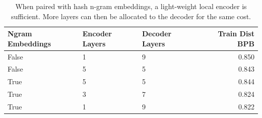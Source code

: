 \begin{table}[t]
\centering

\begin{tabular}{@{}lllr@{}}
\toprule


Ngram Embeddings & Encoder Layers & Decoder Layers & Train Dist BPB \\

\midrule
False &      1 &        9 &       0.850 \\
False &      5 &        5 &       0.843 \\
\midrule
True  &      5 &        5 &       0.844 \\
True  &      3 &        7 &       0.824 \\
True  &      1 &        9 &       0.822 \\
\bottomrule
\end{tabular}

\caption{
When paired with hash n-gram embeddings, a light-weight local encoder is sufficient. More layers can then be allocated to the decoder for the same cost.
}
\label{tab:local_layers}
\end{table}